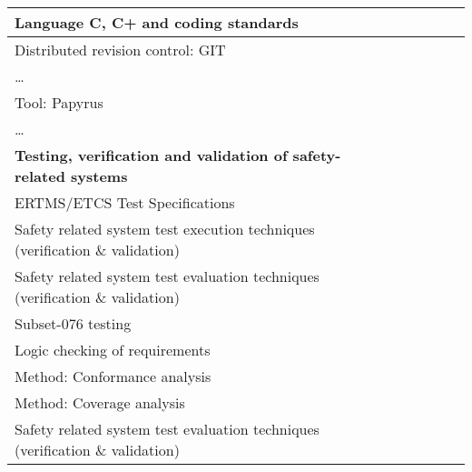 \documentclass[a4paper, 11pt]{article}
\begin{document}
\begin{center}
\begin{longtable}{|r|r|r|r|r|r|r|r|}
    \hline
    \multicolumn{1}{|l|}{Language C, C+ and coding standards} & \multicolumn{1}{l|}{} &       &       &       &       &       &  \bigstrut\\
    \hline
    \multicolumn{1}{|l|}{Distributed revision control: GIT} & \multicolumn{1}{l|}{} &       &       &       &       &       &  \bigstrut\\
    \hline
    \multicolumn{1}{|l|}{…} & \multicolumn{1}{l|}{} &       &       &       &       &       &  \bigstrut\\
    \hline
    \multicolumn{1}{|l|}{Tool: Papyrus} & \multicolumn{1}{l|}{} &       &       &       &       &       &  \bigstrut\\
    \hline
    \multicolumn{1}{|l|}{…} & \multicolumn{1}{l|}{} &       &       &       &       &       &  \bigstrut[t]\\
    \multicolumn{1}{|l|}{\textbf{Testing, verification and validation of safety-related systems}} & \multicolumn{1}{l|}{\textbf{}} &       &       &       &       &       &  \\
    \multicolumn{1}{|l|}{ERTMS/ETCS Test Specifications} & \multicolumn{1}{l|}{} &       &       &       &       &       &  \bigstrut[b]\\
    \hline
    \multicolumn{1}{|l|}{Safety related system test execution techniques (verification \& validation)} & \multicolumn{1}{l|}{} &       &       &       &       &       &  \bigstrut\\
    \hline
    \multicolumn{1}{|l|}{Safety related system test evaluation techniques (verification \& validation)} & \multicolumn{1}{l|}{} &       &       &       &       &       &  \bigstrut\\
    \hline
    \multicolumn{1}{|l|}{Subset-076 testing} & \multicolumn{1}{l|}{} &       &       &       &       &       &  \bigstrut\\
    \hline
    \multicolumn{1}{|l|}{Logic checking of requirements} & \multicolumn{1}{l|}{} &       &       &       &       &       &  \bigstrut\\
    \hline
    \multicolumn{1}{|l|}{Method: Conformance analysis} & \multicolumn{1}{l|}{} &       &       &       &       &       &  \bigstrut\\
    \hline
    \multicolumn{1}{|l|}{Method: Coverage analysis} & \multicolumn{1}{l|}{} &       &       &       &       &       &  \bigstrut\\
    \hline
    \multicolumn{1}{|l|}{Safety related system test evaluation techniques (verification \& validation)} & \multicolumn{1}{l|}{} &       &       &       &       &       &  \bigstrut\\

\end{longtable}
\end{center}
\end{document}
